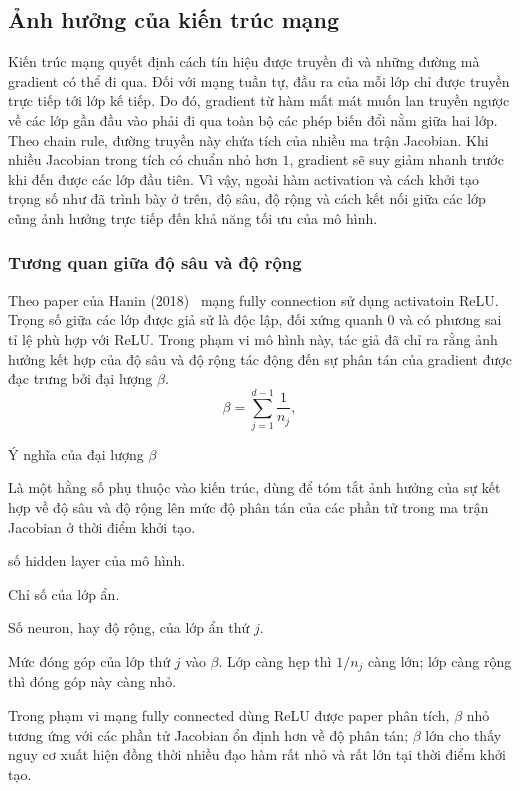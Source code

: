 \documentclass[12pt]{article}
\begin{document}
\subsection{Ảnh hưởng của kiến trúc mạng}

Kiến trúc mạng quyết định cách tín hiệu được truyền đi và những đường mà
gradient có thể đi qua. Đối với mạng tuần tự, đầu ra của mỗi lớp chỉ được
truyền trực tiếp tới lớp kế tiếp. Do đó, gradient từ hàm mất mát muốn lan
truyền ngược về các lớp gần đầu vào phải đi qua toàn bộ các phép biến đổi nằm
giữa hai lớp. Theo chain rule, đường truyền này chứa tích của nhiều ma trận
Jacobian. Khi nhiều Jacobian trong tích có chuẩn nhỏ hơn $1$, gradient sẽ suy
giảm nhanh trước khi đến được các lớp đầu tiên. Vì vậy, ngoài hàm activation
và cách khởi tạo trọng số như đã trình bày ở trên, độ sâu, độ rộng và cách kết
nối giữa các lớp cũng ảnh hưởng trực tiếp đến khả năng tối ưu của mô hình.


\subsubsection{Tương quan giữa độ sâu và độ rộng}

Theo paper của Hanin (2018)~\cite{hanin2018}  mạng fully connection sử dụng activatoin ReLU.
Trọng số giữa các lớp được giả sử là độc lập, đối xứng quanh 0 và có phương sai tỉ lệ phù hợp với
ReLU. Trong phạm vi mô hình này, tác giả đã chỉ ra rằng ảnh hưởng kết hợp của độ sâu và độ rộng tác động
đến sự phân tán của gradient được đạc trưng bởi đại lượng $\beta$.
\[
    \beta=\sum_{j=1}^{d-1}\frac{1}{n_j},
\]

\begin{infobox}{Ý nghĩa của đại lượng $\beta$}
\small
\begin{description}[
    style=multiline,
    leftmargin=3.3em,
    labelwidth=2.5em,
    labelsep=0.8em,
    itemsep=3pt,
    topsep=2pt
]
    \item[$\beta$] Là một hằng số phụ thuộc vào kiến trúc, dùng để tóm tắt ảnh hưởng
    của sự kết hợp về độ sâu và độ rộng lên mức độ phân tán của các phần tử trong ma trận
    Jacobian ở thời điểm khởi tạo.
    \item[$d$] số hidden layer của mô hình.

    \item[$j$] Chỉ số của lớp ẩn.

    \item[$n_j$] Số neuron, hay độ rộng, của lớp ẩn thứ $j$.

    \item[$1/n_j$] Mức đóng góp của lớp thứ $j$ vào $\beta$. Lớp càng hẹp
    thì $1/n_j$ càng lớn; lớp càng rộng thì đóng góp này càng nhỏ.
\end{description}

Trong phạm vi mạng fully connected dùng ReLU được paper phân tích,
$\beta$ nhỏ tương ứng với các phần tử Jacobian ổn định hơn về độ phân tán;
$\beta$ lớn cho thấy nguy cơ xuất hiện đồng thời nhiều đạo hàm rất nhỏ và rất
lớn tại thời điểm khởi tạo.
\end{infobox}
\end{document}
